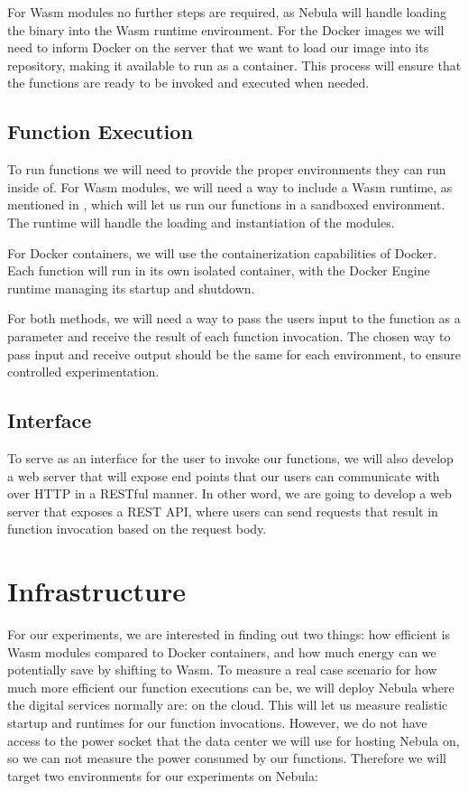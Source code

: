 \documentclass[
  table]{report}
\begin{document}
For Wasm modules no further steps are required, as Nebula will handle
loading the binary into the Wasm runtime environment. For the Docker
images we will need to inform Docker on the server that we want to load
our image into its repository, making it available to run as a
container. This process will ensure that the functions are ready to be
invoked and executed when needed.

\subsection{Function Execution}

To run functions we will need to provide the proper environments they
can run inside of. For \ac{Wasm} modules, we will need a way to include
a \ac{Wasm} runtime, as mentioned in , which
will let us run our functions in a sandboxed environment. The runtime
will handle the loading and instantiation of the modules.

For Docker containers, we will use the containerization capabilities of
Docker. Each function will run in its own isolated container, with the
Docker Engine runtime managing its startup and shutdown.

For both methods, we will need a way to pass the users input to the
function as a parameter and receive the result of each function
invocation. The chosen way to pass input and receive output should be
the same for each environment, to ensure controlled experimentation.

\subsection{Interface}

To serve as an interface for the user to invoke our functions, we will
also develop a web server that will expose end points that our users can
communicate with over HTTP in a RESTful manner. In other word, we are
going to develop a web server that exposes a REST API, where users can
send requests that result in function invocation based on the request
body.

\section{Infrastructure}

For our experiments, we are interested in finding out two things: how
efficient is \ac{Wasm} modules compared to Docker containers, and how
much energy can we potentially save by shifting to \ac{Wasm}. To measure
a real case scenario for how much more efficient our function executions
can be, we will deploy Nebula where the digital services normally are:
on the cloud. This will let us measure realistic startup and runtimes
for our function invocations. However, we do not have access to the
power socket that the data center we will use for hosting Nebula on, so
we can not measure the power consumed by our functions. Therefore we
will target two environments for our experiments on Nebula:
\end{document}
